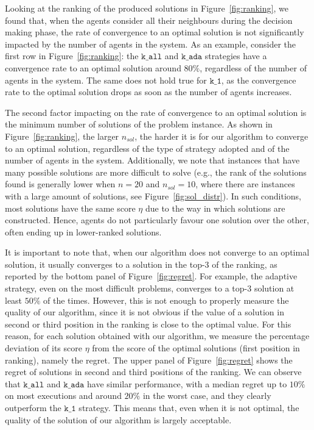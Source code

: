 Looking at the ranking of the produced solutions in Figure~\ref{fig:ranking}, we found that, when the agents consider all their neighbours during the decision making phase, the rate of convergence to an optimal solution is not significantly impacted by the number of agents in the system. As an example, consider the first row in Figure~\ref{fig:ranking}: the $\texttt{k\_all}$ and  $\texttt{k\_ada}$ strategies have a convergence rate to an optimal solution around $80\%$, regardless of the number of agents in the system. The same does not hold true for $\texttt{k\_1}$, as the convergence rate to the optimal solution drops as soon as the number of agents increases. 

The second factor impacting on the rate of convergence to an optimal solution is the minimum number of solutions of the problem instance. As shown in Figure~\ref{fig:ranking}, the larger $n_{sol}$, the harder it is for our algorithm to converge to an optimal solution, regardless of the type of strategy adopted and of the number of agents in the system. Additionally, we note that instances that have many possible solutions are more difficult to solve (e.g., the rank of the solutions found is generally lower when $n=20$ and $n_{sol}=10$, where there are instances with a large amount of solutions, see Figure~\ref{fig:sol_distr}). In such conditions, most solutions have the same score $\eta$ due to the way in which solutions are constructed. Hence, agents do not particularly favour one solution over the other, often ending up in lower-ranked solutions. 

It is important to note that, when our algorithm does not converge to an optimal solution, it usually converges to a solution in the top-3 of the ranking, as reported by the bottom panel of Figure~\ref{fig:regret}. For example, the adaptive strategy, even on the most difficult problems, converges to a top-3 solution at least $50\%$ of the times. However, this is not enough to properly measure the quality of our algorithm, since it is not obvious if the value of a solution in second or third position in the ranking is close to the optimal value. For this reason, for each solution obtained with our algorithm, we measure the percentage deviation of its score $\eta$ from the score of the optimal solutions (first position in ranking), namely the regret. The upper panel of Figure~\ref{fig:regret} shows the regret of solutions in second and third positions of the ranking. We can observe that $\texttt{k\_all}$ and $\texttt{k\_ada}$ have similar performance, with a median regret up to $10\%$ on most executions and around $20\%$ in the worst case, and they clearly outperform the  $\texttt{k\_1}$ strategy. This means that, even when it is not optimal, the quality of the solution of our algorithm is largely acceptable.

